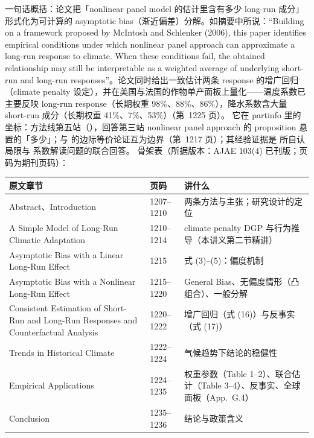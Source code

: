 一句话概括：论文把「nonlinear panel model 的估计里含有多少 long-run 成分」形式化为可计算的 asymptotic bias（渐近偏差）分解。如摘要中所说：``Building on a framework proposed by McIntosh and Schlenker (2006), this paper identifies empirical conditions under which nonlinear panel approach can approximate a long-run response to climate. When these conditions fail, the obtained relationship may still be interpretable as a weighted average of underlying short-run and long-run responses''\citep[第~1207 页]{merel2021climate}。论文同时给出一致估计两条 response 的增广回归（climate penalty 设定），并在美国与法国的作物单产面板上量化——温度系数已主要反映 long-run response（长期权重 98\%、88\%、86\%），降水系数含大量 short-run 成分（长期权重 41\%、7\%、53\%）（第~1225 页）。
它在 partinfo 里的坐标：方法线第五站（），回答第三站 nonlinear panel approach 的 proposition 悬置的「多少」；与  的边际等价论证互为边界（第~1217 页）；其经验证据是  所自认局限与  系数解读问题的联合回答。
骨架表（所据版本：AJAE 103(4) 已刊版；页码为期刊页码）：

\begin{table}[htbp]
\centering\small
\begin{tabular}{@{}p{5.4cm}p{1.6cm}p{6.0cm}@{}}
\toprule
原文章节 & 页码 & 讲什么 \\
\midrule
Abstract、Introduction & 1207--1210 & 两条方法与主张；研究设计的定位 \\
A Simple Model of Long-Run Climatic Adaptation & 1210--1214 & climate penalty DGP 与行为推导（本讲义第二节精讲） \\
Asymptotic Bias with a Linear Long-Run Effect & 1215 & 式 (3)--(5)：偏度机制 \\
Asymptotic Bias with a Nonlinear Long-Run Effect & 1215--1220 & General Bias、无偏度情形（凸组合）、一般分解 \\
Consistent Estimation of Short-Run and Long-Run Responses and Counterfactual Analysis & 1220--1222 & 增广回归（式 (16)）与反事实（式 (17)） \\
Trends in Historical Climate & 1222--1224 & 气候趋势下结论的稳健性 \\
Empirical Applications & 1224--1235 & 权重参数（Table 1--2）、联合估计（Table 3--4）、反事实、全球面板（App.~G.4） \\
Conclusion & 1235--1236 & 结论与政策含义 \\
\bottomrule
\end{tabular}
\end{table}

